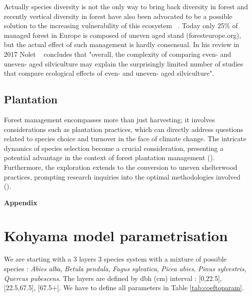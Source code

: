 \documentclass{article}
\begin{document}
Actually species diversity is not the only way to bring back diversity in forest and recently vertical diversity in forest have also been advocated to be a possible solution to the increasing vulnerability of this ecosystem ~\autocite{guldinRoleUnevenAgedSilviculture1996}. Today only 25\% of managed forest in Europe is composed of uneven aged stand (foresteurope.org), but the actual effect of such management is hardly consensual. In his review in 2017 Nolet ~\autocite{noletComparingEffectsEven2018} concludes that "overall, the complexity	of comparing even- and uneven- aged silviculture may explain the surprisingly limited number of studies that compare ecological effects of even- and uneven- aged silviculture".

\subsection{Plantation}

Forest management encompasses more than just harvesting; it involves considerations such as plantation practices, which can directly address questions related to species choice and turnover in the face of climate change. The intricate dynamics of species selection become a crucial consideration, presenting a potential advantage in the context of forest plantation management (\autocite{brockerhoffPlantationForestsBiodiversity2008}). Furthermore, the exploration extends to the conversion to uneven shelterwood practices, prompting research inquiries into the optimal methodologies involved (\autocite{sinhaOptimalManagementNaturally2017,dudumanForestManagementPlanning2011,nylandEvenUnevenagedChallenges2003}).

\clearpage

\printbibliography

\clearpage


\begin{center}
    \textbf{\Large Appendix}
\end{center}

\appendix

\section{Kohyama model parametrisation}

We are starting with a 3 layers 3 species system with a mixture of possible species : \textit{Abies alba}, \textit{Betula pendula}, \textit{Fagus sylvatica}, \textit{Picea abies}, \textit{Pinus sylvestris}, \textit{Quercus pubescens}. The layers are defined by dbh (cm) interval : [0,22.5], [22.5,67.5], [67.5+[. We have to define all parameters in Table \ref{tab:coeftoparam}.
\end{document}
